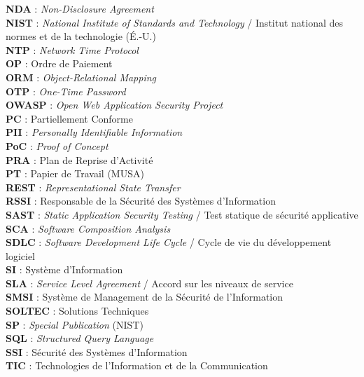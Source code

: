 \documentclass[12pt,a4paper,oneside]{report}
\begin{document}
\textbf{NDA} : \textit{Non-Disclosure Agreement}\\[2pt]
\textbf{NIST} : \textit{National Institute of Standards and Technology} / Institut national des normes et de la technologie (É.-U.)\\[2pt]
\textbf{NTP} : \textit{Network Time Protocol}\\[2pt]
\textbf{OP} : Ordre de Paiement\\[2pt]
\textbf{ORM} : \textit{Object-Relational Mapping}\\[2pt]
\textbf{OTP} : \textit{One-Time Password}\\[2pt]
\textbf{OWASP} : \textit{Open Web Application Security Project}\\[2pt]
\textbf{PC} : Partiellement Conforme\\[2pt]
\textbf{PII} : \textit{Personally Identifiable Information}\\[2pt]
\textbf{PoC} : \textit{Proof of Concept}\\[2pt]
\textbf{PRA} : Plan de Reprise d'Activité\\[2pt]
\textbf{PT} : Papier de Travail (MUSA)\\[2pt]
\textbf{REST} : \textit{Representational State Transfer}\\[2pt]
\textbf{RSSI} : Responsable de la Sécurité des Systèmes d'Information\\[2pt]
\textbf{SAST} : \textit{Static Application Security Testing} / Test statique de sécurité applicative\\[2pt]
\textbf{SCA} : \textit{Software Composition Analysis}\\[2pt]
\textbf{SDLC} : \textit{Software Development Life Cycle} / Cycle de vie du développement logiciel\\[2pt]
\textbf{SI} : Système d'Information\\[2pt]
\textbf{SLA} : \textit{Service Level Agreement} / Accord sur les niveaux de service\\[2pt]
\textbf{SMSI} : Système de Management de la Sécurité de l'Information\\[2pt]
\textbf{SOLTEC} : Solutions Techniques\\[2pt]
\textbf{SP} : \textit{Special Publication} (NIST)\\[2pt]
\textbf{SQL} : \textit{Structured Query Language}\\[2pt]
\textbf{SSI} : Sécurité des Systèmes d'Information\\[2pt]
\textbf{TIC} : Technologies de l'Information et de la Communication\\[2pt]
\end{document}
